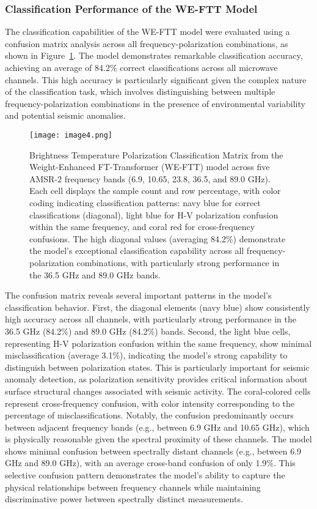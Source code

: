 \documentclass[fleqn,10pt]{wlscirep_mdpi_style}
\begin{document}
\subsubsection{Classification Performance of the WE-FTT Model}
The classification capabilities of the WE-FTT model were evaluated using a confusion matrix analysis across all frequency-polarization combinations, as shown in Figure~\ref{fig:fig4}. The model demonstrates remarkable classification accuracy, achieving an average of 84.2\% correct classifications across all microwave channels. This high accuracy is particularly significant given the complex nature of the classification task, which involves distinguishing between multiple frequency-polarization combinations in the presence of environmental variability and potential seismic anomalies.

\begin{figure}[!htbp]
\centering
\texttt{[image: image4.png]}
\caption{Brightness Temperature Polarization Classification Matrix from the Weight-Enhanced FT-Transformer (WE-FTT) model across five AMSR-2 frequency bands (6.9, 10.65, 23.8, 36.5, and 89.0 GHz). Each cell displays the sample count and row percentage, with color coding indicating classification patterns: navy blue for correct classifications (diagonal), light blue for H-V polarization confusion within the same frequency, and coral red for cross-frequency confusions. The high diagonal values (averaging 84.2\%) demonstrate the model's exceptional classification capability across all frequency-polarization combinations, with particularly strong performance in the 36.5 GHz and 89.0 GHz bands.}
\label{fig:fig4}
\end{figure}

The confusion matrix reveals several important patterns in the model's classification behavior. First, the diagonal elements (navy blue) show consistently high accuracy across all channels, with particularly strong performance in the 36.5 GHz (84.2\%) and 89.0 GHz (84.2\%) bands. Second, the light blue cells, representing H-V polarization confusion within the same frequency, show minimal misclassification (average 3.1\%), indicating the model's strong capability to distinguish between polarization states. This is particularly important for seismic anomaly detection, as polarization sensitivity provides critical information about surface structural changes associated with seismic activity.
The coral-colored cells represent cross-frequency confusion, with color intensity corresponding to the percentage of misclassifications. Notably, the confusion predominantly occurs between adjacent frequency bands (e.g., between 6.9 GHz and 10.65 GHz), which is physically reasonable given the spectral proximity of these channels. The model shows minimal confusion between spectrally distant channels (e.g., between 6.9 GHz and 89.0 GHz), with an average cross-band confusion of only 1.9\%. This selective confusion pattern demonstrates the model's ability to capture the physical relationships between frequency channels while maintaining discriminative power between spectrally distinct measurements.
\end{document}
